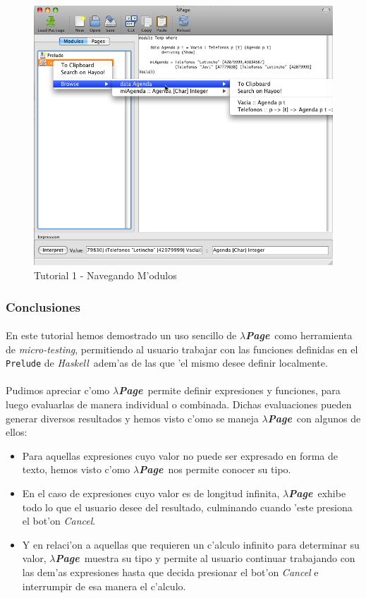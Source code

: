 \documentclass[a4paper]{article}
\newcommand{\haskell}{\textsl{Haskell}}
\newcommand{\hpage}{\textbf{\textsl{$\lambda$Page}}}
\begin{document}
\begin{figure}[hp]
	\begin{center}
        	\includegraphics[width=.9\textwidth]{pictures/tut1/13}
		\caption{Tutorial 1 - Navegando M'odulos}
		\label{tut113}
	\end{center}
\end{figure}

\newpage
\subsubsection{Conclusiones}
\paragraph{}En este tutorial hemos demostrado un uso sencillo de \hpage\ como herramienta de \textsl{micro-testing}, permitiendo al usuario trabajar con las funciones definidas en el \texttt{Prelude} de \haskell\ adem'as de las que 'el mismo desee definir localmente.
\paragraph{}Pudimos apreciar c'omo \hpage\ permite definir expresiones y funciones, para luego evaluarlas de manera individual o combinada.  Dichas evaluaciones pueden generar diversos resultados y hemos visto c'omo se maneja \hpage\ con algunos de ellos:
\begin{itemize}
\item Para aquellas expresiones cuyo valor no puede ser expresado en forma de texto, hemos visto c'omo \hpage\ nos permite conocer su tipo.
\item En el caso de expresiones cuyo valor es de longitud infinita, \hpage\ exhibe todo lo que el usuario desee del resultado, culminando cuando 'este presiona el bot'on \textsl{Cancel}.
\item Y en relaci'on a aquellas que requieren un c'alculo infinito para determinar su valor, \hpage\ muestra su tipo y permite al usuario continuar trabajando con las dem'as expresiones hasta que decida presionar el bot'on \textsl{Cancel} e interrumpir de esa manera el c'alculo.
\end{itemize}
\end{document}
